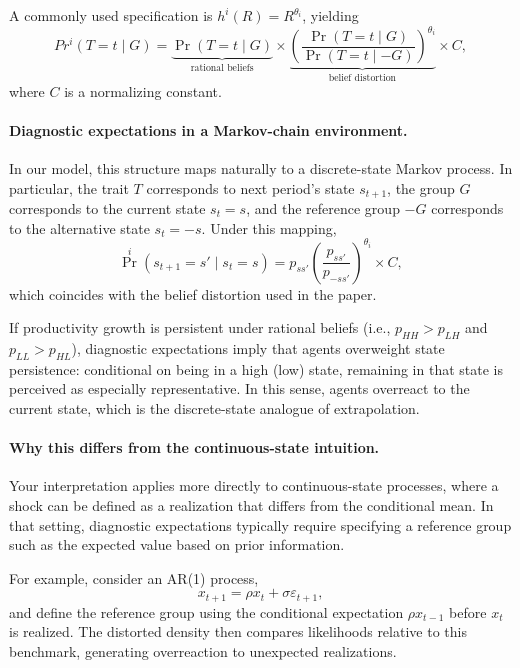 \documentclass[12pt,a4paper]{article}
\begin{document}
A commonly used specification is $h^i(R)=R^{\theta_i}$, yielding
\begin{equation}
Pr^i(T=t \mid G)
=
\underbrace{\Pr(T=t \mid G)}_{\text{rational beliefs}}
\times
\underbrace{\left(\frac{\Pr(T=t \mid G)}{\Pr(T=t \mid -G)}\right)^{\theta_i}}_{\text{belief distortion}}
\times C,
\end{equation}
where $C$ is a normalizing constant.

\paragraph{Diagnostic expectations in a Markov-chain environment.}
In our model, this structure maps naturally to a discrete-state Markov process. In
particular, the trait $T$ corresponds to next period's state $s_{t+1}$, the group $G$
corresponds to the current state $s_t=s$, and the reference group $-G$ corresponds to the
alternative state $s_t=-s$. Under this mapping,
\begin{equation}
\Pr^i(s_{t+1}=s' \mid s_t=s)
=
p_{ss'}
\left(\frac{p_{ss'}}{p_{-s s'}}\right)^{\theta_i}
\times C,
\end{equation}
which coincides with the belief distortion used in the paper.

If productivity growth is persistent under rational beliefs (i.e.,
$p_{HH}>p_{LH}$ and $p_{LL}>p_{HL}$), diagnostic expectations imply that agents overweight
state persistence: conditional on being in a high (low) state, remaining in that state is
perceived as especially representative. In this sense, agents overreact to the current
state, which is the discrete-state analogue of extrapolation.

\paragraph{Why this differs from the continuous-state intuition.}
Your interpretation applies more directly to continuous-state processes, where a shock
can be defined as a realization that differs from the conditional mean. In that setting,
diagnostic expectations typically require specifying a reference group such as the
expected value based on prior information.

For example, \citet{bordalo2020overreaction} consider an AR(1) process,
\begin{equation}
x_{t+1} = \rho x_t + \sigma \varepsilon_{t+1},
\end{equation}
and define the reference group using the conditional expectation $\rho x_{t-1}$ before $x_t$ is realized. The
distorted density then compares likelihoods relative to this benchmark, generating
overreaction to unexpected realizations.
\end{document}
